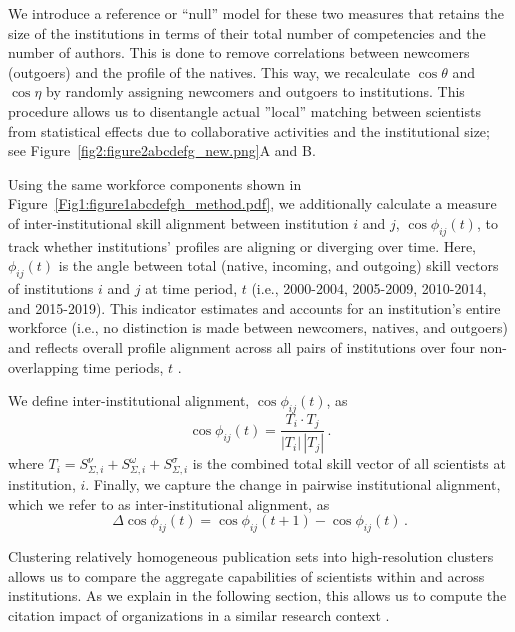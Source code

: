 \documentclass[draft,final]{vutinfth} %
\begin{document}
We introduce a reference or ``null'' model for these two measures that retains the size of the institutions in terms of their total number of competencies and the number of authors. This is done to remove correlations between newcomers (outgoers) and the profile of the natives. This way, we recalculate $\cos\theta$ and $\cos\eta$ by randomly assigning newcomers and outgoers to institutions. This procedure allows us to disentangle actual ''local'' matching between scientists from statistical effects due to collaborative activities and the institutional size; see Figure~\ref{fig2:figure2abcdefg_new.png}A and B.

Using the same workforce components shown in Figure~\ref{Fig1:figure1abcdefgh_method.pdf}, we additionally calculate a measure of inter-institutional skill alignment between institution $i$ and $j$, $\cos\phi_{ij}(t)$, to track whether institutions' profiles are aligning or diverging over time. 
Here, $\phi_{ij}(t)$ is the angle between total (native, incoming, and outgoing) skill vectors of institutions $i$ and $j$ at time period, $t$ (i.e., 2000-2004, 2005-2009, 2010-2014, and 2015-2019).
This indicator estimates and accounts for an institution's entire workforce (i.e., no distinction is made between newcomers, natives, and outgoers) and reflects overall profile alignment across all pairs of institutions over four non-overlapping time periods, $t$ . 

We define inter-institutional alignment, $\cos\phi_{ij}(t)$, as
%
\begin{equation} \label{Eq.~3}
 \cos \phi_{ij}(t) = \frac{T_i\cdot T_j}{|T_i|\,|T_j|} \, .
\end{equation}
%
where $T_i=S^{\nu}_{\Sigma,i}+S^{\omega}_{\Sigma,i}+S^{\sigma}_{\Sigma,i}$ is the combined total skill vector of all scientists at institution, $i$. Finally, we capture the change in pairwise institutional alignment, which we refer to as inter-institutional alignment, as
%
\begin{equation} \label{Eq.~4}
 \Delta \cos \phi_{ij}(t) = \cos\phi_{ij}(t+1) - \cos\phi_{ij}(t) \, .
\end{equation}

Clustering relatively homogeneous publication sets into high-resolution clusters allows us to compare the aggregate capabilities of scientists within and across institutions. As we explain in the following section, this allows us to compute the citation impact of organizations in a similar research context \cite{waltman2012new, ruiz2015field}.
\end{document}
